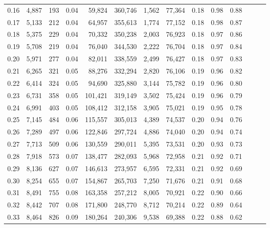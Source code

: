 \begin{tabular}{rrrrrrrrrrrrrr}
0.16 &   4,887 &    193 &  0.04 &   59,824 &  360,746 &   1,562 &  77,364 &  0.18 &  0.98 &      0.88 \\
0.17 &   5,133 &    212 &  0.04 &   64,957 &  355,613 &   1,774 &  77,152 &  0.18 &  0.98 &      0.87 \\
0.18 &   5,375 &    229 &  0.04 &   70,332 &  350,238 &   2,003 &  76,923 &  0.18 &  0.97 &      0.86 \\
0.19 &   5,708 &    219 &  0.04 &   76,040 &  344,530 &   2,222 &  76,704 &  0.18 &  0.97 &      0.84 \\
0.20 &   5,971 &    277 &  0.04 &   82,011 &  338,559 &   2,499 &  76,427 &  0.18 &  0.97 &      0.83 \\
0.21 &   6,265 &    321 &  0.05 &   88,276 &  332,294 &   2,820 &  76,106 &  0.19 &  0.96 &      0.82 \\
0.22 &   6,414 &    324 &  0.05 &   94,690 &  325,880 &   3,144 &  75,782 &  0.19 &  0.96 &      0.80 \\
0.23 &   6,731 &    358 &  0.05 &  101,421 &  319,149 &   3,502 &  75,424 &  0.19 &  0.96 &      0.79 \\
0.24 &   6,991 &    403 &  0.05 &  108,412 &  312,158 &   3,905 &  75,021 &  0.19 &  0.95 &      0.78 \\
0.25 &   7,145 &    484 &  0.06 &  115,557 &  305,013 &   4,389 &  74,537 &  0.20 &  0.94 &      0.76 \\
0.26 &   7,289 &    497 &  0.06 &  122,846 &  297,724 &   4,886 &  74,040 &  0.20 &  0.94 &      0.74 \\
0.27 &   7,713 &    509 &  0.06 &  130,559 &  290,011 &   5,395 &  73,531 &  0.20 &  0.93 &      0.73 \\
0.28 &   7,918 &    573 &  0.07 &  138,477 &  282,093 &   5,968 &  72,958 &  0.21 &  0.92 &      0.71 \\
0.29 &   8,136 &    627 &  0.07 &  146,613 &  273,957 &   6,595 &  72,331 &  0.21 &  0.92 &      0.69 \\
0.30 &   8,254 &    655 &  0.07 &  154,867 &  265,703 &   7,250 &  71,676 &  0.21 &  0.91 &      0.68 \\
0.31 &   8,491 &    755 &  0.08 &  163,358 &  257,212 &   8,005 &  70,921 &  0.22 &  0.90 &      0.66 \\
0.32 &   8,442 &    707 &  0.08 &  171,800 &  248,770 &   8,712 &  70,214 &  0.22 &  0.89 &      0.64 \\
0.33 &   8,464 &    826 &  0.09 &  180,264 &  240,306 &   9,538 &  69,388 &  0.22 &  0.88 &      0.62 \\

\end{tabular}
